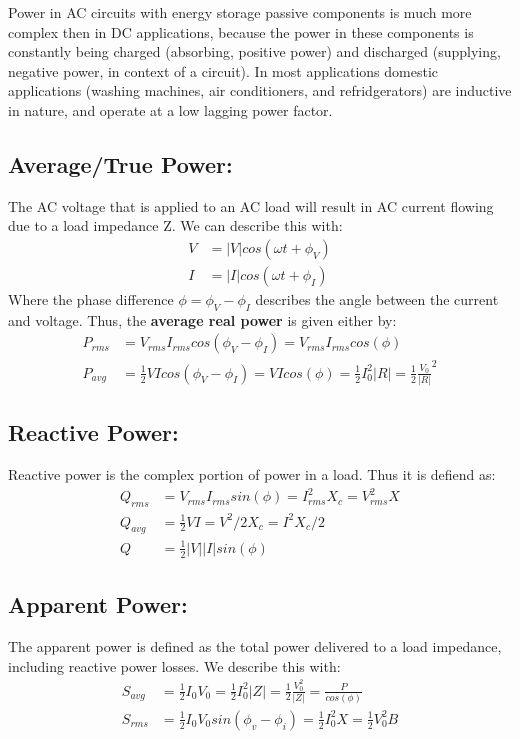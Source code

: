 \documentclass{book}
\begin{document}
Power in AC circuits with energy storage passive components is much more complex then in DC applications, because the power in these components is constantly being charged (absorbing, positive power) and discharged (supplying, negative power, in context of a circuit). In most applications domestic applications (washing machines, air conditioners, and refridgerators) are inductive in nature, and operate at a low lagging power factor.

\subsection{Average/True Power:}
The AC voltage that is applied to an AC load will result in AC current flowing due to a load impedance Z. We can describe this with:
\begin{align*}
	V &= |V| cos(\omega t + \phi _V) \\
	I &= |I|cos(\omega t + \phi_I)
\end{align*}
Where the phase difference $\phi = \phi_V - \phi_I$ describes the angle between the current and voltage.
Thus, the \textbf{average real power} is given either by:
\begin{align*}
	P_{rms} &= V_{rms} I_{rms} cos(\phi_V - \phi_I) = V_{rms} I_{rms} cos(\phi) \\
	P_{avg} &= \frac{1}{2} V I cos(\phi_V - \phi_I) = V I cos(\phi) = \frac{1}{2}I_0 ^2 |R| = \frac{1}{2} \frac{V_0}{|R|}^2
\end{align*}

\subsection{Reactive Power:} Reactive power is the complex portion of power in a load. Thus it is defiend as:
\begin{align*}
	Q_{rms} &= V_{rms} I_{rms} sin(\phi) = I_{rms}^2 X_c =  V_{rms}^2 X\\
	Q_{avg} &= \frac{1}{2} V I = V^2 / 2X_c = I^2X_c / 2 	\\
	Q &= \frac{1}{2}|V||I| sin (\phi)
\end{align*}
\subsection{Apparent Power:}
The apparent power is defined as the total power delivered to a load impedance, including reactive power losses. We describe this with:
\begin{align*}
	S_{avg}&=\frac{1}{2} I_0 V_0  = \frac{1}{2} I_0 ^2|Z| = \frac{1}{2} \frac{V_0 ^2}{|Z|} = \frac{P}{cos(\phi)} \\
	S_{rms}&= \frac{1}{2} I_0 V_0 sin(\phi_v - \phi_i) = \frac{1}{2}I_0^2 X = \frac{1}{2}V_0^2 B
\end{align*}
\end{document}
